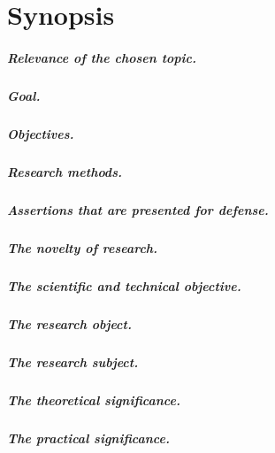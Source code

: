 \renewcommand{\thesubfigure}{\alph{subfigure}}
\renewcommand{\figurename}{Figure}
\renewcommand{\tablename}{Table}
\setcounter{figure}{0}
\setcounter{table}{0}
\setcounter{equation}{0}	%

\chapter*{Synopsis}

\paragraph*{Relevance of the chosen topic.}
\paragraph*{Goal.}
\paragraph*{Objectives.}
\paragraph*{Research methods.}
\paragraph*{Assertions that are presented for defense.}
\paragraph*{The novelty of research.}
\paragraph*{The scientific and technical objective.}
\paragraph*{The research object.}
\paragraph*{The research subject.}
\paragraph*{The theoretical significance.}
\paragraph*{The practical significance.}

